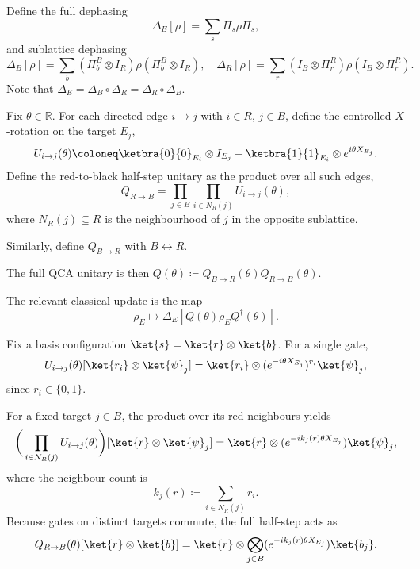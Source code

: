Define the full dephasing
\begin{equation}
    \Delta_E[\rho] = \sum_s \Pi_s \rho \Pi_s,
\end{equation}
and sublattice dephasing
\begin{equation}
    \Delta_B[\rho] = \sum_b (\Pi_b^B \otimes I_R) \rho (\Pi_b^B \otimes I_R),
    \quad
    \Delta_R[\rho] = \sum_r (I_B \otimes \Pi_r^R) \rho (I_B \otimes \Pi_r^R).
\end{equation}
Note that \(\Delta_E = \Delta_B \circ \Delta_R = \Delta_R \circ \Delta_B\).

Fix \(\theta \in \mathbb{R}\). For each directed edge \(i \to j\) with \(i \in R\), \(j \in B\), define the controlled \(X\)-rotation on the target \(E_j\),
\begin{equation}
    U_{i\to j}(\theta) \coloneq \ketbra{0}{0}_{E_i} \otimes I_{E_j} + \ketbra{1}{1}_{E_i} \otimes e^{i\theta X_{E_j}}.
\end{equation}
Define the red-to-black half-step unitary as the product over all such edges,
\begin{equation}
    Q_{R\to B} = \prod_{j \in B} \prod_{i \in N_R(j)} U_{i\to j}(\theta),
\end{equation}
where \(N_R(j) \subseteq R\) is the neighbourhood of \(j\) in the opposite sublattice.

Similarly, define \(Q_{B\to R}\) with \(B \leftrightarrow R\).

The full QCA unitary is then \(Q(\theta) \coloneq Q_{B\to R}(\theta) Q_{R\to B}(\theta)\).

The relevant classical update is the map
\begin{equation}
    \rho_E \mapsto \Delta_E[Q(\theta) \rho_E Q^\dagger(\theta)].
\end{equation}

Fix a basis configuration \(\ket{s} = \ket{r} \otimes \ket{b}\). For a single gate,
\begin{equation}
    U_{i\to j}(\theta)[\ket{r_i} \otimes \ket{\psi}_j] = \ket{r_i} \otimes (e^{-i\theta X_{E_j}})^{r_i} \ket{\psi}_j,
\end{equation}
since \(r_i \in \{0,1\}\).

For a fixed target \(j \in B\), the product over its red neighbours yields
\begin{equation}
    \bigg(\prod_{i \in N_R(j)} U_{i\to j}(\theta) \bigg)[\ket{r} \otimes \ket{\psi}_j] = \ket{r} \otimes (e^{-ik_j(r)\theta X_{E_j}}) \ket{\psi}_j,
\end{equation}
where the neighbour count is
\begin{equation}
    k_j(r) \coloneq \sum_{i \in N_R(j)} r_i.
\end{equation}
Because gates on distinct targets commute, the full half-step acts as
\begin{equation}\label{eq:half-step-factor}
    Q_{R\to B}(\theta)[\ket{r} \otimes \ket{b}] = \ket{r} \otimes \bigotimes_{j \in B} (e^{-ik_j(r)\theta X_{E_j}}) \ket{b_j}.
\end{equation}

